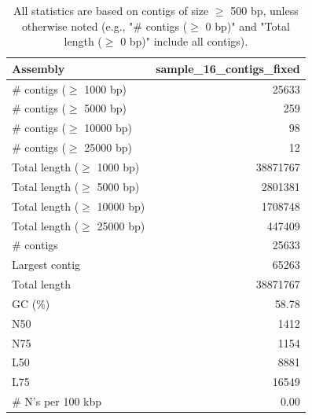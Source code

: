 \documentclass[12pt,a4paper]{article}
\begin{document}
\begin{table}[ht]
\begin{center}
\caption{All statistics are based on contigs of size $\geq$ 500 bp, unless otherwise noted (e.g., "\# contigs ($\geq$ 0 bp)" and "Total length ($\geq$ 0 bp)" include all contigs).}
\begin{tabular}{|l*{1}{|r}|}
\hline
Assembly & sample\_16\_contigs\_fixed \\ \hline
\# contigs ($\geq$ 1000 bp) & 25633 \\ \hline
\# contigs ($\geq$ 5000 bp) & 259 \\ \hline
\# contigs ($\geq$ 10000 bp) & 98 \\ \hline
\# contigs ($\geq$ 25000 bp) & 12 \\ \hline
Total length ($\geq$ 1000 bp) & 38871767 \\ \hline
Total length ($\geq$ 5000 bp) & 2801381 \\ \hline
Total length ($\geq$ 10000 bp) & 1708748 \\ \hline
Total length ($\geq$ 25000 bp) & 447409 \\ \hline
\# contigs & 25633 \\ \hline
Largest contig & 65263 \\ \hline
Total length & 38871767 \\ \hline
GC (\%) & 58.78 \\ \hline
N50 & 1412 \\ \hline
N75 & 1154 \\ \hline
L50 & 8881 \\ \hline
L75 & 16549 \\ \hline
\# N's per 100 kbp & 0.00 \\ \hline
\end{tabular}
\end{center}
\end{table}
\end{document}
